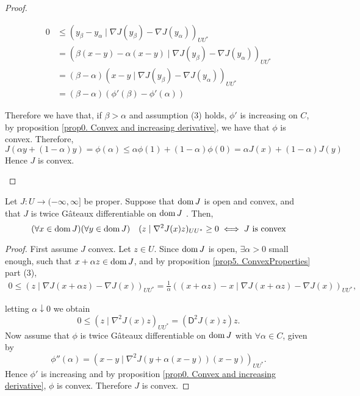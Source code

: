 \begin{proposition}
\begin{proof}
\begin{itemize}
		 \begin{align*}
		 0 &\leq (y_\beta - y_\alpha \mid \nabla J(y_\beta)-\nabla J(y_\alpha))_{UU^*}\\
		   &=(\beta (x-y) - \alpha(x-y) \mid \nabla J(y_\beta)-\nabla J(y_\alpha))_{UU^*} \\
	 	   &=(\beta-\alpha) (x-y \mid \nabla J(y_\beta)-\nabla J(y_\alpha))_{UU^*} \\
	 	   &= (\beta-\alpha) \left(\phi'(\beta)-\phi'(\alpha)\right)
		 \end{align*} 
		 
		 Therefore we have that, if $\beta > \alpha$ and assumption (3) holds, $\phi'$ is increasing on $C$, by proposition \eqref{prop0. Convex and increasing derivative}, we have that $\phi$ is convex. Therefore,
		 \[
		 J(\alpha y+(1-\alpha)y)=\phi(\alpha) \leq \alpha \phi(1)+(1-\alpha)\phi(0)=\alpha J(x) +(1-\alpha)J(y)
		 \]
		 Hence $J$ is convex.
		\end{itemize}
	 \end{proof}
\label{prop5. First derivative convex.}
\end{proposition}

\begin{theorem}
	\label{th5. Secon derivative convex.}
	 Let $J: U \rightarrow (-\infty, \infty]$ be proper. Suppose that $\mathrm{dom\,} J$
	 is open and convex, and that $J$ is twice G\^ateaux differentiable on $\mathrm{dom\,} J$ . Then,
	 \[
		 (\forall x \in \mathrm{dom\,} J )(\forall y \in \mathrm{dom\,} J ) \quad (z\mid  \nabla^2 J(x)z)_{UU^*} \geq 0 \iff J \text{ is convex}
	 \]
	 \begin{proof}
	 	First assume $J$ convex. Let $z \in U$. Since $\mathrm{dom\,} J$ is open, $\exists \alpha >0$ small enough, such that $x+\alpha z \in \mathrm{dom\,} J$, and by proposition \eqref{prop5. ConvexProperties} part (3), 
	 	\begin{align*}
	 		0 \leq	(z \mid \nabla J(x+\alpha z)-\nabla J(x))_{UU^*} = \frac{1}{\alpha} ((x+\alpha z) -x \mid \nabla J(x+\alpha z)-\nabla J(x))_{UU^*},
	 	\end{align*}
	 	
	 	letting $\alpha \downarrow 0$ we obtain
	 	\[
	 	0 \leq	(z \mid \nabla^2 J(x)z)_{UU^*} = (\mathsf{D}^2 J(x) z)z.
	 	\] 
	 	Now assume that $\phi$ is twice G\^ateaux differentiable on $\mathrm{dom\,} J$ with $\forall \alpha \in C$, given by
	 	\[
	 	 \phi''(\alpha) = (x-y \mid \nabla^2 J(y+\alpha(x-y))(x-y))_{UU^*}.
	 	\]
	 	Hence $\phi'$ is increasing and by proposition \eqref{prop0. Convex and increasing derivative}, $\phi$ is convex. Therefore $J$ is convex.
	 \end{proof}
\end{theorem}

